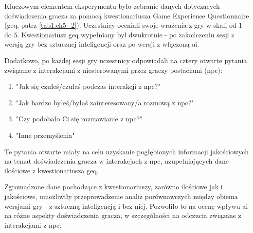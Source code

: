 Kluczowym elementem eksperymentu było zebranie danych dotyczących doświadczenia gracza za pomocą
kwestionariusza Game Experience Questionnaire (\gls{geq}, patrz \ref{tab1:ch5_2}). Uczestnicy oceniali swoje
wrażenia z gry w skali od 1 do 5. Kwestionariusz \gls{geq} wypełniany był dwukrotnie - po zakończeniu sesji z
wersją gry bez sztucznej inteligencji oraz po wersji z włączoną \gls{ai}.

Dodatkowo, po każdej sesji gry uczestnicy odpowiadali na cztery otwarte pytania związane z
interakcjami z niesterowanymi przez graczy postaciami (\gls{npc}):

\begin{enumerate}
    \item "Jak się czułeś/czułaś podczas interakcji z \gls{npc}?"
    \item "Jak bardzo byłeś/byłaś zainteresowany/a rozmową z \gls{npc}?"
    \item "Czy podobało Ci się rozmawianie z \gls{npc}?"
    \item "Inne przemyślenia"
\end{enumerate}

Te pytania otwarte miały na celu uzyskanie pogłębionych informacji jakościowych na temat
doświadczenia gracza w interakcjach z \gls{npc}, uzupełniających dane ilościowe z kwestionariusza \gls{geq}.

Zgromadzone dane pochodzące z kwestionariuszy, zarówno ilościowe jak i jakościowe, umożliwiły
przeprowadzenie analiz porównawczych między obiema wersjami gry - z sztuczną inteligencją i bez
niej. Pozwoliło to na ocenę wpływu \gls{ai} na różne aspekty doświadczenia gracza, w szczególności na
odczucia związane z interakcjami z \gls{npc}.